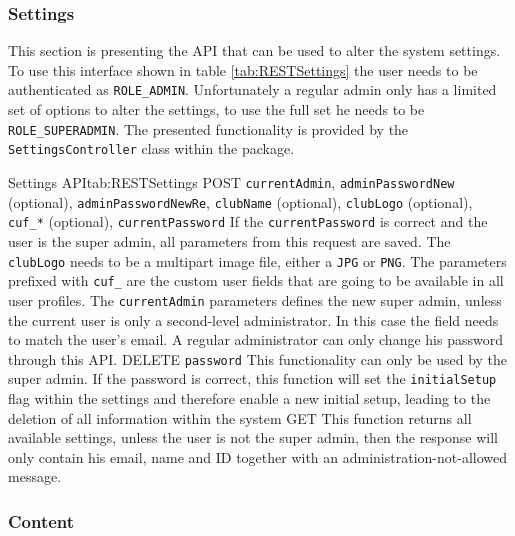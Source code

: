 \subsubsection{Settings}

This section is presenting the \gls{API} that can be used to alter the system settings. To use this interface shown in table \vref{tab:RESTSettings} the user needs to be authenticated as \texttt{ROLE\_ADMIN}. Unfortunately a regular admin only has a limited set of options to alter the settings, to use the full set he needs to be \texttt{ROLE\_SUPERADMIN}. The presented functionality is provided by the \texttt{SettingsController} class within the  package.

\newpage

\begin{RESTTable}{Settings API}{tab:RESTSettings}
		{POST}
		{\texttt{currentAdmin}, \texttt{adminPasswordNew} (optional), \texttt{adminPasswordNewRe}, \texttt{clubName} (optional), \texttt{clubLogo} (optional), \texttt{cuf\_*} (optional), \texttt{currentPassword}}
		{If the \texttt{currentPassword} is correct and the user is the super admin, all parameters from this request are saved. The \texttt{clubLogo} needs to be a multipart image file, either a \texttt{JPG} or \texttt{PNG}. The parameters prefixed with \texttt{cuf\_} are the custom user fields that are going to be available in all user profiles. The \texttt{currentAdmin} parameters defines the new super admin, unless the current user is only a second-level administrator. In this case the field needs to match the user's email. A regular administrator can only change his password through this \gls{API}.}
		{DELETE}
		{\texttt{password}}
		{This functionality can only be used by the super admin. If the password is correct, this function will set the \texttt{initialSetup} flag within the settings and therefore enable a new initial setup, leading to the deletion of all information within the system}
		{GET}
		{}
		{This function returns all available settings, unless the user is not the super admin, then the response will only contain his email, name and ID together with an administration-not-allowed message.}
\end{RESTTable}

\subsubsection{Content}

